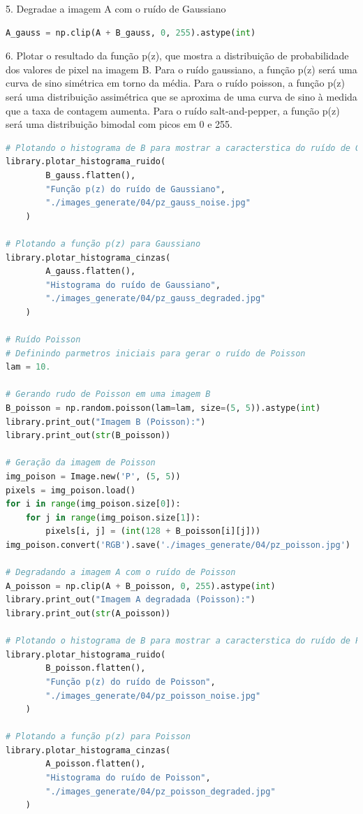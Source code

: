 \documentclass[10pt,a4paper]{article}
\begin{document}
\begin{flushleft}
5. Degradae a imagem A com o ruído de Gaussiano
\end{flushleft}

\begin{lstlisting}[language=Python]
A_gauss = np.clip(A + B_gauss, 0, 255).astype(int)
\end{lstlisting}

\begin{flushleft}
6. Plotar o resultado da função p(z), que mostra a distribuição de probabilidade dos valores de pixel na imagem B. Para o ruído gaussiano, a função p(z) será uma curva de sino simétrica em torno da média. Para o ruído poisson, a função p(z) será uma distribuição assimétrica que se aproxima de uma curva de sino à medida que a taxa de contagem aumenta. Para o ruído salt-and-pepper, a função p(z) será uma distribuição bimodal com picos em 0 e 255.
\end{flushleft}

\begin{lstlisting}[language=Python]
# Plotando o histograma de B para mostrar a caracterstica do ruído de Gaussiano
library.plotar_histograma_ruido(
        B_gauss.flatten(),
        "Função p(z) do ruído de Gaussiano", 
        "./images_generate/04/pz_gauss_noise.jpg"
    )

# Plotando a função p(z) para Gaussiano
library.plotar_histograma_cinzas(
        A_gauss.flatten(),
        "Histograma do ruído de Gaussiano", 
        "./images_generate/04/pz_gauss_degraded.jpg"
    )

# Ruído Poisson
# Definindo parmetros iniciais para gerar o ruído de Poisson
lam = 10.

# Gerando rudo de Poisson em uma imagem B
B_poisson = np.random.poisson(lam=lam, size=(5, 5)).astype(int)
library.print_out("Imagem B (Poisson):")
library.print_out(str(B_poisson))

# Geração da imagem de Poisson
img_poison = Image.new('P', (5, 5))
pixels = img_poison.load()
for i in range(img_poison.size[0]):
    for j in range(img_poison.size[1]):
        pixels[i, j] = (int(128 + B_poisson[i][j]))
img_poison.convert('RGB').save('./images_generate/04/pz_poisson.jpg')

# Degradando a imagem A com o ruído de Poisson
A_poisson = np.clip(A + B_poisson, 0, 255).astype(int)
library.print_out("Imagem A degradada (Poisson):")
library.print_out(str(A_poisson))

# Plotando o histograma de B para mostrar a caracterstica do ruído de Poisson
library.plotar_histograma_ruido(
        B_poisson.flatten(),
        "Função p(z) do ruído de Poisson", 
        "./images_generate/04/pz_poisson_noise.jpg"
    )

# Plotando a função p(z) para Poisson
library.plotar_histograma_cinzas(
        A_poisson.flatten(),
        "Histograma do ruído de Poisson", 
        "./images_generate/04/pz_poisson_degraded.jpg"
    )
\end{lstlisting}
\end{document}

